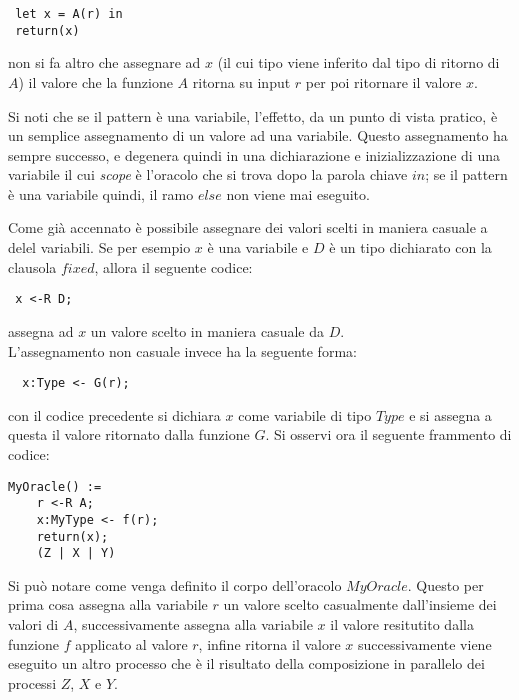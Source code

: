 \documentclass[a4paper,openright,twoside,12pt]{report}
\begin{document}
\begin{verbatim}
 let x = A(r) in
 return(x) 
\end{verbatim}
 
non si fa altro che assegnare ad $x$ (il cui tipo viene inferito dal tipo di ritorno di $A$) il valore che la funzione $A$ ritorna su input $r$ per poi ritornare il valore $x$.

Si noti che se il pattern \`e una variabile, l'effetto, da un punto di vista pratico, \`e un semplice assegnamento di un valore ad una variabile.
Questo assegnamento ha sempre successo, e degenera quindi in una dichiarazione e inizializzazione di una variabile il cui \emph{scope} \`e l'oracolo che si trova dopo la parola chiave $in$; 
se il pattern \`e una variabile quindi, il ramo $else$ non viene mai eseguito.

Come gi\`a accennato \`e possibile assegnare dei valori scelti in maniera casuale a delel variabili. Se per esempio $x$ \`e una variabile e $D$ \`e un tipo dichiarato
con la clausola $fixed$, allora il seguente codice:
 

\begin{verbatim}
 x <-R D;
\end{verbatim}
 
assegna ad $x$ un valore scelto in maniera casuale da $D$. \\
L'assegnamento non casuale invece ha la seguente forma:
 
 
\begin{verbatim}
  x:Type <- G(r);
 \end{verbatim}
 
con il codice precedente si dichiara $x$ come variabile di tipo $Type$ e si assegna a questa il valore ritornato dalla funzione $G$.
Si osservi ora il seguente frammento di codice:
\begin{verbatim}
MyOracle() :=
    r <-R A;
    x:MyType <- f(r);
    return(x);
    (Z | X | Y)
\end{verbatim}
Si pu\`o notare come venga definito il corpo dell'oracolo $MyOracle$. Questo per prima cosa assegna alla variabile $r$ un valore scelto casualmente dall'insieme dei valori di $A$,
successivamente assegna alla variabile $x$ il valore resitutito dalla funzione $f$ applicato al valore $r$, infine ritorna il valore $x$ successivamente viene eseguito un altro processo
che \`e il risultato della composizione in parallelo dei processi $Z$, $X$ e $Y$. \\ \\
\end{document}
